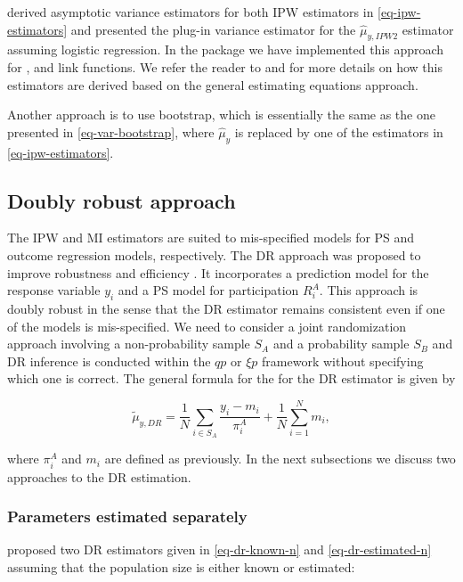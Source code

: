 \documentclass[
]{jss}
\begin{document}
\citet[section 3.2]{chen2020doubly} derived asymptotic variance
estimators for both IPW estimators in \eqref{eq-ipw-estimators} and
presented the plug-in variance estimator for the \(\hat{\mu}_{y,IPW2}\)
estimator assuming logistic regression. In the package we have
implemented this approach for ,  and
 link functions. We refer the reader to
\citet[section 6.2]{wu2022statistical} and
\citet[chapter 3]{chrostowski2024statistical} for more details on how
this estimators are derived based on the general estimating equations
approach.

Another approach is to use bootstrap, which is essentially the same as
the one presented in \eqref{eq-var-bootstrap}, where \(\hat{\mu}_y\) is
replaced by one of the estimators in \eqref{eq-ipw-estimators}.

\subsection{Doubly robust approach}\label{sec-dr-approach}

The IPW and MI estimators are suited to mis-specified models for PS and
outcome regression models, respectively. The DR approach was proposed to
improve robustness and efficiency \citep[cf.][]{robins1994estimation}.
It incorporates a prediction model for the response variable \(y_i\) and
a PS model for participation \(R_i^A\). This approach is doubly robust
in the sense that the DR estimator remains consistent even if one of the
models is mis-specified. We need to consider a joint randomization
approach involving a non-probability sample \(S_A\) and a probability
sample \(S_B\) and DR inference is conducted within the \(qp\) or
\(\xi p\) framework without specifying which one is correct. The general
formula for the for the DR estimator is given by

\[
\tilde{\mu}_{y,DR} = \frac{1}{N}\sum_{i \in S_A}\frac{y_i - m_i}{\pi_i^A} + \frac{1}{N}\sum_{i =1}^N m_i,
\]

where \(\pi_i^A\) and \(m_i\) are defined as previously. In the next
subsections we discuss two approaches to the DR estimation.

\subsubsection{Parameters estimated
separately}\label{parameters-estimated-separately}

\citet{chen2020doubly} proposed two DR estimators given in
\eqref{eq-dr-known-n} and \eqref{eq-dr-estimated-n} assuming that the
population size is either known or estimated:
\end{document}
